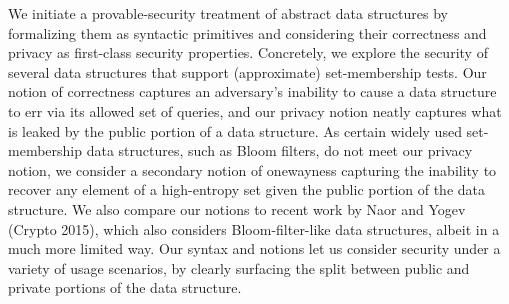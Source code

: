 We initiate a provable-security treatment of abstract data
structures by formalizing them as syntactic primitives and
considering their correctness and privacy as first-class security
properties.  Concretely, we explore the security of several data
structures that support (approximate) set-membership tests.  Our
notion of correctness captures an adversary's inability to cause a
data structure to err via its allowed set of queries, and our
privacy notion neatly captures what is leaked by the public portion
of a data structure.  As certain widely used set-membership data
structures, such as Bloom filters, do not meet our privacy notion,
we consider a secondary notion of onewayness capturing the inability
to recover any element of a high-entropy set given the public
portion of the data structure. We also compare our notions to recent
work by Naor and Yogev (Crypto 2015), which also considers
Bloom-filter-like data structures, albeit in a much more limited
way.  Our syntax and notions let us consider security under a
variety of usage scenarios, by clearly surfacing the split between
public and private portions of the data structure.

